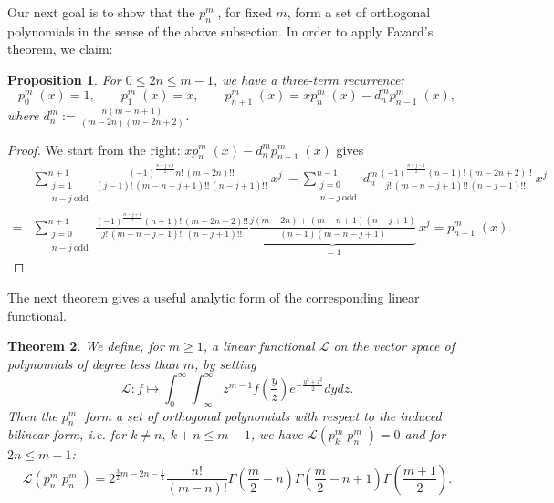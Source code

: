 \documentclass{amsart}
\newcommand{\ie}{{\it i.e. }}
\newcommand{\p}[2]{p_{#1}^{#2}\;\!\!}
\renewcommand{\L}{\mathcal{L}}
\newcommand{\coloneqq}{:=}
\theoremstyle{plain}
\newtheorem{theorem}{Theorem}[section]
\newtheorem{proposition}[theorem]{Proposition}
\theoremstyle{definition}
\theoremstyle{remark}
\begin{document}
Our next goal is to show that the $\p{n}{m}$, for fixed $m$, form a set of orthogonal polynomials in the sense of the above subsection. In order to apply Favard's theorem, we claim:
\begin{proposition} \label{threeterm} For $0\leq 2n\leq m-1$, we have a three-term recurrence:
\begin{equation*}
\p{0}{m}(x) = 1,\qquad \p{1}{m}(x) = x, \qquad \p{n+1}{m}(x) = x\p{n}{m}(x) -d_n^m \p{n-1}{m}(x),
\end{equation*} 
where $d_n^m\coloneqq \frac{n(m-n+1)}{(m-2n)(m-2n+2)}$.
\end{proposition}
\begin{proof}
We start from the right: $ x\p{n}{m}(x) -d_n^m \p{n-1}{m}(x)$ gives
\begin{align*}
 &\textstyle \sum\limits_{\substack{j=1\\ n-j\ \text{odd}}}^{n+1} \!\!\!\frac{(-1)^{\frac{n-j+1}{2}} n!\,(m-2n)!!}{(j-1)!\,(m-n-j+1)!!\,(n-j+1)!!}\: x^j 
\ - \sum\limits_{\substack{j=0\\ n-j\ \text{odd}}}^{n-1} \!\!\!d_n^m\frac{(-1)^{\frac{n-j-1}{2}} (n-1)!\,(m-2n+2)!!}{j!\,(m-n-j+1)!!\,(n-j-1)!!}\: x^j 
\\=&\textstyle \sum\limits_{\substack{j=0\\ n-j\ \text{odd}}}^{n+1} \!\!\!\frac{(-1)^{\frac{n-j+1}{2}} (n+1)!\,(m-2n-2)!!}{j!\,(m-n-j-1)!!\,(n-j+1)!!}\underbrace{\textstyle
\frac{j(m-2n)+(m-n+1)(n-j+1)}{(n+1)(m-n-j+1)}}_{=1} \,x^j = \p{n+1}{m}(x) .
\end{align*} \nobreak
\end{proof}
The next theorem gives a useful analytic form of the corresponding linear functional.
\begin{theorem} \label{pthm}We define, for $m\geq 1$, a linear functional $\L$ on the vector space of polynomials of degree less than $m$, by setting
\begin{equation}
\L: f \longmapsto \int_0^\infty\!\!\! \int_{-\infty}^\infty z^{m-1}f\left(\frac{y}{z}\right) e^{-\frac{y^2+z^2}{2}} dydz.
\end{equation}
Then the $\p{n}{m}$ form a set of orthogonal polynomials with respect to the induced bilinear form, \ie for $k\neq n,\ k\!+\! n\leq m\!-\!1$, we have $\L(\p{k}{m}\p{n}{m})=0$ and for $2n\leq m\!-\!1$:
\begin{equation} \label{Lpn2}
\L(\p{n}{m}\p{n}{m}) = 2^{\frac{3}{2}m-2n-\frac{1}{2}}  \frac{n!}{(m-n)!}
\Gamma\left(\frac{m}{2}-n\right)\Gamma\left(\frac{m}{2}-n+1\right)\Gamma\left(\frac{m+1}{2}\right).
\end{equation}
\end{theorem}
\end{document}
